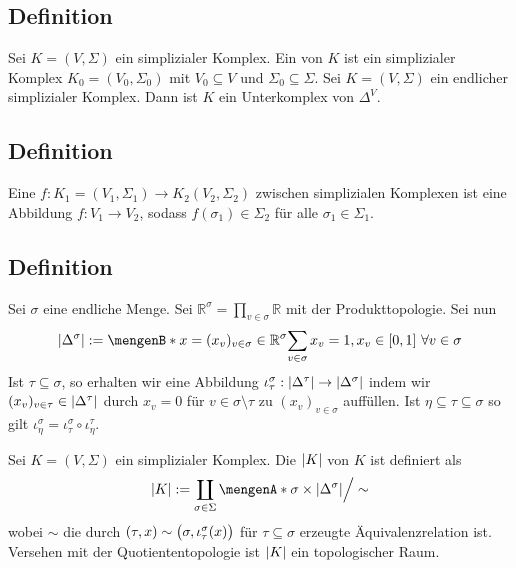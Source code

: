 \subsection[Definition: Unterkomplex]{Definition} %
\label{sub:24}
Sei $K=(V, \Sigma)$ ein simplizialer Komplex. Ein  von $K$ ist ein simplizialer Komplex $K_0 = (V_0, \Sigma_0)$ mit 
$V_0 \subseteq V$ und $\Sigma_0 \subseteq \Sigma$.
Sei $K=(V,\Sigma)$ ein endlicher simplizialer Komplex. Dann ist $K$ ein Unterkomplex von $\Delta^V$.

\subsection[Definition: Simpliziale Abbildung]{Definition} %
\label{sub:25}
Eine  $f \colon K_1=(V_1, \Sigma_1) \to K_2(V_2, \Sigma_2)$ zwischen simplizialen Komplexen ist eine Abbildung $f \colon V_1 \to V_2$, sodass 
$f(\sigma_1) \in \Sigma_2$ für alle $\sigma_1 \in \Sigma_1$. 

\subsection[Definition: Geometrische Realisierung]{Definition} %
\label{sub:26}
Sei $\sigma$ eine endliche Menge. Sei $\mathds{R}^\sigma = \prod_{v \in \sigma} \mathds{R}$ mit der Produkttopologie. Sei nun 
\[
	\abs*{\Delta^\sigma} := \set[x=(x_v)_{v \in \sigma} \in \mathds{R}^\sigma]{\sum_{v \in \sigma}x_v = 1 , x_v \in [0,1] \,\, \forall v \in \sigma}  
\]
Ist $\tau \subseteq \sigma$, so erhalten wir eine Abbildung $\iota_\tau^\sigma : \abs*{\Delta^\tau}  \to \abs*{\Delta^\sigma}$ indem wir 
$(x_v)_{v \in \tau} \in \abs*{\Delta^\tau}$ durch $x_v=0$ für $v \in \sigma \setminus \tau$ zu $(x_v)_{v \in \sigma}$ auffüllen. Ist $\eta \subseteq \tau \subseteq \sigma$ 
so gilt $\iota^\sigma_\eta = \iota_\tau^\sigma \circ  \iota_\eta^\tau$.

\noindent Sei $K=(V, \Sigma)$ ein simplizialer Komplex. Die  $\abs*{K}$ von $K$ ist definiert als 
\[
	\abs*{K} := \coprod_{\sigma \in \Sigma} \set{\sigma} \times \abs*{\Delta^\sigma} \Big/ \sim
\] 
wobei $\sim$ die durch $(\tau, x) \sim \enbrace[\big]{\sigma, \iota_\tau^\sigma(x)}$ für $\tau \subseteq \sigma$ erzeugte Äquivalenzrelation ist. Versehen mit der 
Quotiententopologie ist $\abs*{K}$ ein topologischer Raum.

